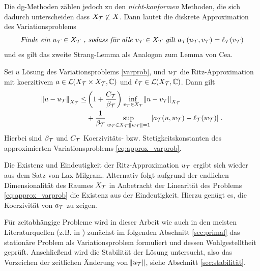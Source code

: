 Die \ac{dg}-Methoden zählen jedoch zu den \emph{nicht-konformen} Methoden, die sich dadurch unterscheiden dass $X_{\mathcal{T}}\not\subset X$. Dann lautet die diskrete Approximation des Variationsproblems
\begin{equation}
  \emph{Finde ein } u_{\mathcal{T}}\in X_{\mathcal{T}}\emph{ , sodass für alle } v_{\mathcal{T}}\in X_{\mathcal{T}} \emph{ gilt } a_{\mathcal{T}}(u_{\mathcal{T}}, v_{\mathcal{T}}) = \ell_{\mathcal{T}}(v_{\mathcal{T}})
  \label{eq:approx_varprob}
\end{equation}
und es gilt das zweite Strang-Lemma als Analogon zum Lemma von Cea.
\begin{satz}\label{strang}
  Sei $u$ Lösung des Variationsproblems \ref{varprob}, und $u_{\mathcal{T}}$ die Ritz-Approximation mit koerzitivem $a \in \mathcal{L}(X_{\mathcal{T}} \times X_{\mathcal{T}}, \mathbb{C})$ und $\ell_{\mathcal{T}} \in \mathcal{L}(X_{\mathcal{T}}, \mathbb{C})$. Dann gilt
  \begin{equation*}
    \begin{aligned}
    \norm{u-u_{\mathcal{T}}}_{X_{\mathcal{T}}} \leq &\left(1 +\frac{C_{\mathcal{T}}}{\beta_{\mathcal{T}}}\right) \inf_{v_{\mathcal{T}} \in X_{\mathcal{T}}}\norm{u-v_{\mathcal{T}}}_{X_{\mathcal{T}}} \\
    & +\frac{1}{\beta_{\mathcal{T}}} \sup_{w_{\mathcal{T}} \in X_{\mathcal{T}}: \norm{w_{\mathcal{T}}}=1} |a_{\mathcal{T}}(u,w_{\mathcal{T}})-\ell_{\mathcal{T}}(w_{\mathcal{T}})| \; .
  \end{aligned}
\end{equation*}
  Hierbei sind $\beta_{\mathcal{T}}$ und $C_{\mathcal{T}}$ Koerzivitäts- bzw. Stetigkeitskonstanten des approximierten Variationsproblems \ref{eq:approx_varprob}.
\end{satz}
Die Existenz und Eindeutigkeit der Ritz-Approximation $u_{\mathcal{T}}$ ergibt sich wieder aus dem Satz von Lax-Milgram. Alternativ folgt aufgrund der endlichen Dimensionalität des Raumes $X_{\mathcal{T}}$ in Anbetracht der Linearität des Problems \eqref{eq:approx_varprob} die Existenz aus der Eindeutigkeit. Hierzu genügt es, die Koerzivität von $a_{\mathcal{T}}$ zu zeigen.

Für zeitabhängige Probleme wird in dieser Arbeit wie auch in den meisten Literaturquellen (z.B. in \cite{NLS}) zunächst im folgenden Abschnitt \ref{sec:primal} das stationäre Problem als Variationsproblem formuliert und dessen Wohlgestelltheit geprüft. Anschließend wird die Stabilität der Lösung untersucht, also das Vorzeichen der zeitlichen Änderung von $\norm{u_{\mathcal{T}}}$, siehe Abschnitt \ref{sec:stabilität}.


